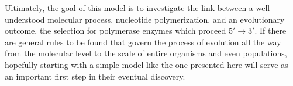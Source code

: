 Ultimately, the goal of this model is to investigate the link between a well understood molecular process, nucleotide polymerization, and an evolutionary outcome, the selection for polymerase enzymes which proceed $5'\to3'$. If there are general rules to be found that govern the process of evolution all the way from the molecular level to the scale of entire organisms and even populations, hopefully starting with a simple model like the one presented here will serve as an important first step in their eventual discovery.

